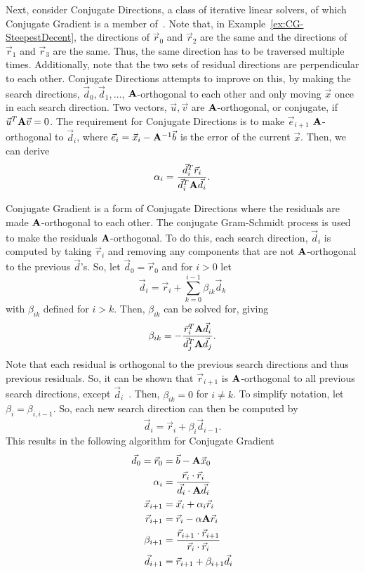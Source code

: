 Next, consider Conjugate Directions, a class of iterative linear solvers, of which Conjugate Gradient is a member of~\cite{Shewchuk:1994:IntroToCG}.
Note that, in Example~\ref{ex:CG-SteepestDecent}, the directions of \(\vec{r}_0\) and \(\vec{r}_2\) are the same and the directions of \(\vec{r}_1\) and \(\vec{r}_3\) are the same.
Thus, the same direction has to be traversed multiple times.
Additionally, note that the two sets of residual directions are perpendicular to each other.
Conjugate Directions attempts to improve on this, by making the search directions, \(\vec{d}_0, \vec{d}_1, \dots\), \(\mathbf{A}\)-orthogonal to each other and only moving \(\vec{x}\) once in each search direction.
Two vectors, \(\vec{u}, \vec{v}\) are \(\mathbf{A}\)-orthogonal, or conjugate, if \(\vec{u}^T\mathbf{A}\vec{v}=0\).
The requirement for Conjugate Directions is to make \(\vec{e}_{i+1}\) \(\mathbf{A}\)-orthogonal to \(\vec{d}_i\), where \(\vec{e}_i = \vec{x}_i - \mathbf{A}^{-1}\vec{b}\) is the error of the current \(\vec{x}\).
Then, we can derive
\[
	\alpha_i = \frac{\vec{d}_i^T\vec{r}_i}{\vec{d}_i^T\mathbf{A}\vec{d}_i}.
\]

Conjugate Gradient is a form of Conjugate Directions where the residuals are made \(\mathbf{A}\)-orthogonal to each other.
The conjugate Gram-Schmidt process is used to make the residuals \(\mathbf{A}\)-orthogonal.
To do this, each search direction, \(\vec{d}_i\) is computed by taking \(\vec{r}_i\) and removing any components that are not \(\mathbf{A}\)-orthogonal to the previous \(\vec{d}\)'s.
So, let \(\vec{d}_0 = \vec{r}_0\) and for \(i > 0\) let
\[
	\vec{d}_i = \vec{r}_i + \sum_{k=0}^{i-1} \beta_{ik}\vec{d}_k
\]
with \(\beta_{ik}\) defined for \(i > k\).
Then, \(\beta_{ik}\) can be solved for, giving
\[
	\beta_{ik} = -\frac{\vec{r}_i^T\mathbf{A}\vec{d}_i}{\vec{d}_j^T\mathbf{A}\vec{d}_j}.
\]
Note that each residual is orthogonal to the previous search directions and thus previous residuals.
So, it can be shown that \(\vec{r}_{i+1}\) is \(\mathbf{A}\)-orthogonal to all previous search directions, except \(\vec{d}_i\)~\cite{Shewchuk:1994:IntroToCG}.
Then, \(\beta_{ik} = 0\) for \(i \neq k\).
To simplify notation, let \(\beta_i = \beta_{i,i-1}\).
So, each new search direction can then be computed by
\[
	\vec{d}_i = \vec{r}_i + \beta_i\vec{d}_{i-1}.
\]
This results in the following algorithm for Conjugate Gradient
\begin{align*}
	\vec{d}_0 = \vec{r}_0 &= \vec{b} - \mathbf{A}\vec{x}_0 \\
	\alpha_i &= \frac{\vec{r}_i\cdot\vec{r}_i}{\vec{d}_i\cdot \mathbf{A}\vec{d}_i} \\
	\vec{x}_{i+1} &= \vec{x}_i + \alpha_i\vec{r}_i \\
	\vec{r}_{i+1} &= \vec{r}_i - \alpha\mathbf{A}\vec{r}_i \\
	\beta_{i+1} &= \frac{\vec{r}_{i+1}\cdot\vec{r}_{i+1}}{\vec{r}_i\cdot\vec{r}_i} \\
	\vec{d}_{i+1} &= \vec{r}_{i+1} + \beta_{i+1}\vec{d}_i
\end{align*}